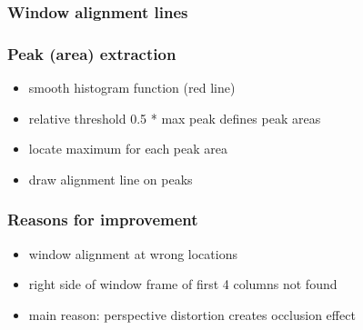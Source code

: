 \documentclass{beamer}
\begin{document}
\frame
{
	\frametitle{Window alignment lines}
}
\frame
{
	\frametitle{Peak (area) extraction}
	\begin{itemize}
	\item <+-| alert@+> smooth histogram function (red line) 
	\item <+-| alert@+> relative threshold 0.5 * max peak defines peak areas
	\item <+-| alert@+> locate maximum for each peak area
	\item <+-| alert@+> draw alignment line on peaks
	\end{itemize}
}


\frame
{
	\frametitle{Reasons for improvement}
	\begin{itemize}
	\item <+-| alert@+> window alignment at wrong locations
	\item <+-| alert@+> right side of window frame of first 4 columns not found
	\item <+-| alert@+> main reason: perspective distortion creates occlusion effect
	\end{itemize}
}

\frame
{
}
\end{document}
